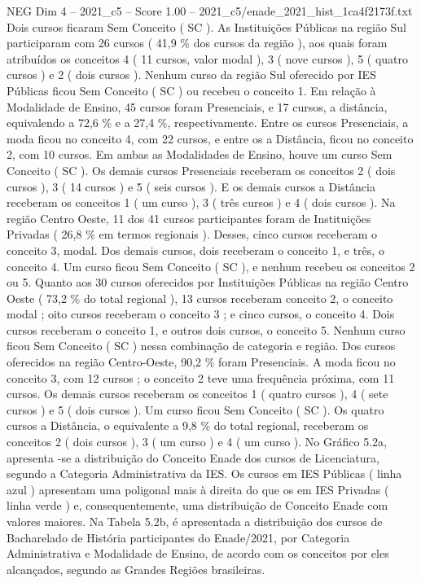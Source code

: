 \begin{textsample}{NEG Dim 4 – 2021\_c5 – Score 1.00 – 2021\_c5/enade\_2021\_hist\_1ca4f2173f.txt}
Dois cursos ficaram Sem Conceito ( SC ).
As Instituições Públicas na região Sul participaram com 26 cursos ( 41,9 \% dos cursos da região ), aos quais foram atribuídos os conceitos 4 ( 11 cursos, valor modal ), 3 ( nove cursos ), 5 ( quatro cursos ) e 2 ( dois cursos ).
Nenhum curso da região Sul oferecido por IES Públicas ficou Sem Conceito ( SC ) ou recebeu o conceito 1.
Em relação à Modalidade de Ensino, 45 cursos foram Presenciais, e 17 cursos, a distância, equivalendo a 72,6 \% e a 27,4 \%, respectivamente.
Entre os cursos Presenciais, a moda ficou no conceito 4, com 22 cursos, e entre os a Distância, ficou no conceito 2, com 10 cursos.
Em ambas as Modalidades de Ensino, houve um curso Sem Conceito ( SC ).
Os demais cursos Presenciais receberam os conceitos 2 ( dois cursos ), 3 ( 14 cursos ) e 5 ( seis cursos ).
E os demais cursos a Distância receberam os conceitos 1 ( um curso ), 3 ( três cursos ) e 4 ( dois cursos ).
Na região Centro Oeste, 11 dos 41 cursos participantes foram de Instituições Privadas ( 26,8 \% em termos regionais ).
Desses, cinco cursos receberam o conceito 3, modal.
Dos demais cursos, dois receberam o conceito 1, e três, o conceito 4.
Um curso ficou Sem Conceito ( SC ), e nenhum recebeu os conceitos 2 ou 5.
Quanto aos 30 cursos oferecidos por Instituições Públicas na região Centro Oeste ( 73,2 \% do total regional ), 13 cursos receberam conceito 2, o conceito modal ; oito cursos receberam o conceito 3 ; e cinco cursos, o conceito 4.
Dois cursos receberam o conceito 1, e outros dois cursos, o conceito 5.
Nenhum curso ficou Sem Conceito ( SC ) nessa combinação de categoria e região.
Dos cursos oferecidos na região Centro-Oeste, 90,2 \% foram Presenciais.
A moda ficou no conceito 3, com 12 cursos ; o conceito 2 teve uma frequência próxima, com 11 cursos.
Os demais cursos receberam os conceitos 1 ( quatro cursos ), 4 ( sete cursos ) e 5 ( dois cursos ).
Um curso ficou Sem Conceito ( SC ).
Os quatro cursos a Distância, o equivalente a 9,8 \% do total regional, receberam os conceitos 2 ( dois cursos ), 3 ( um curso ) e 4 ( um curso ).
No Gráfico 5.2a, apresenta -se a distribuição do Conceito Enade dos cursos de Licenciatura, segundo a Categoria Administrativa da IES.
Os cursos em IES Públicas ( linha azul ) apresentam uma poligonal mais à direita do que os em IES Privadas ( linha verde ) e, consequentemente, uma distribuição de Conceito Enade com valores maiores.
Na Tabela 5.2b, é apresentada a distribuição dos cursos de Bacharelado de História participantes do Enade/2021, por Categoria Administrativa e Modalidade de Ensino, de acordo com os conceitos por eles alcançados, segundo as Grandes Regiões brasileiras.

\end{textsample}
